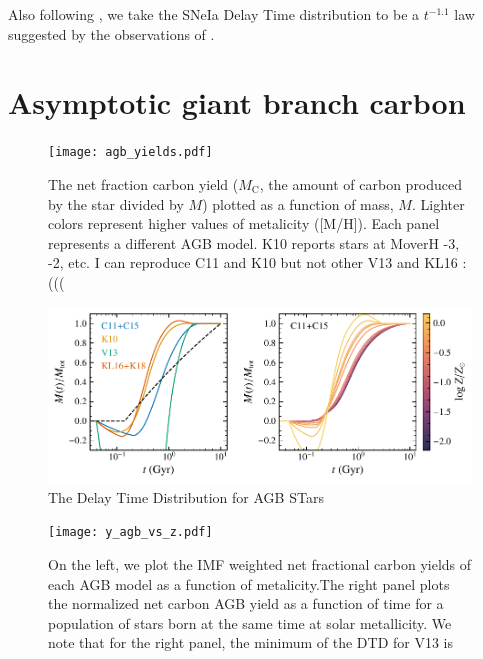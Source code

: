 \documentclass[12pt,oneside]{report}
\begin{document}
Also following \citet{james+21, james+22}, we take the SNeIa Delay Time distribution to be a
$t^{-1.1}$ law suggested by the observations of \citet{maoz+12}.


\section{Asymptotic giant branch carbon}

\begin{figure}
    \centering
 	    \texttt{[image: agb\_yields.pdf]}\\

        \caption[AGB carbon yields]{The net fraction carbon yield ($M_\text{C}$, the amount of carbon produced by the star divided by $M$) plotted as a function of mass, $M$. Lighter colors represent higher values of metalicity ([M/H]). Each panel represents a different AGB model. K10 reports stars at MoverH -3, -2, etc. I can reproduce C11 and K10 but not other V13 and KL16 :(((}

    \label{fig:y_agb}
\end{figure}

\begin{figure}
    \includegraphics[scale=1]{y_agb_t2.pdf}

    \caption[AGB yields delayed-time-distribution]{
    The Delay Time Distribution for AGB STars}

\end{figure}

\begin{figure}
    \centering
    
    \texttt{[image: y\_agb\_vs\_z.pdf]}

    \caption[AGB yield metallicity dependence]{On the left, we plot the IMF weighted net fractional carbon yields of each AGB model as a function of metalicity.The right panel plots the normalized net carbon AGB yield as a function of time for a population of stars born at the same time at solar metallicity. We note that for the right panel, the minimum of the DTD for V13 is }

\end{figure}
\end{document}
